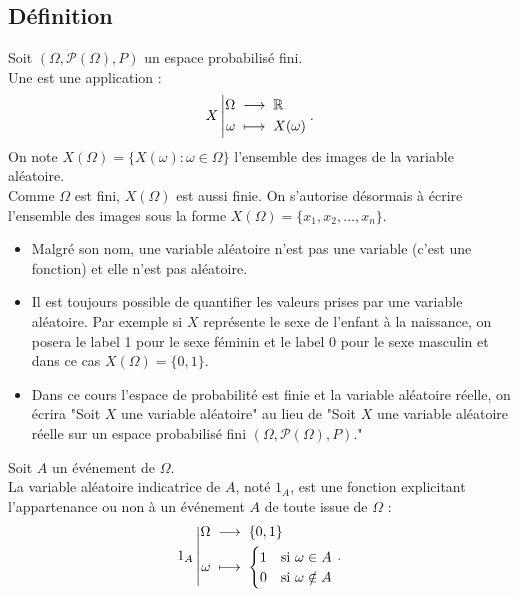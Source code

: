 \documentclass{book}
\begin{document}
\subsection{Définition}

\begin{Definition}
Soit $(\Omega,\mathcal{P}(\Omega),P)$ un espace probabilisé fini.\\
Une  est une application : $${X}\left|\begin{aligned}{\Omega}&\;\longrightarrow\;{\mathbb{R}}\\{\omega}&\;\longmapsto\;{X(\omega)}\end{aligned}\right..$$
On note $X(\Omega)=\{X(\omega):\omega \in \Omega \}$ l'ensemble des images de la variable aléatoire.\\
Comme $\Omega$ est fini, $X(\Omega)$ est aussi finie. On s'autorise désormais à écrire l'ensemble des images sous la forme $X (\Omega) = \{x_1,x_2,\dots,x_n\}$.
\end{Definition}
\begin{Remarque}
\begin{itemize}
\item Malgré son nom, une variable aléatoire n'est pas une variable (c'est une fonction) et elle n'est pas aléatoire.
\item Il est toujours possible de quantifier les valeurs prises par une variable aléatoire. Par exemple si $X$ représente le sexe de l'enfant à la naissance, on posera le label 1 pour le sexe féminin et le label 0 pour le sexe masculin et dans ce cas $X(\Omega)=\{0,1\}$.
\item Dans ce cours l'espace de probabilité  est finie et la variable aléatoire  réelle, on écrira "Soit $X$ une variable aléatoire" au lieu de "Soit $X$ une variable aléatoire réelle sur un espace probabilisé fini $(\Omega,\mathcal{P}(\Omega),P)$."
\end{itemize}
\end{Remarque}
\begin{Exemple}
Soit $A$ un événement de $\Omega$.\\
La variable aléatoire indicatrice de $A$, noté $1_A$,  est une fonction  explicitant l'appartenance ou non à un événement $A$ 
de toute issue de $\Omega$ :
$${1_A}\left|\begin{aligned}{\Omega}&\;\longrightarrow\;{\{0,1\}}\\{\omega}&\;\longmapsto\;{\begin{cases}1&\text{si }\omega\in A \\0&\text{si }\omega\notin A
\end{cases}}\end{aligned}\right..$$
\end{Exemple}
\end{document}
